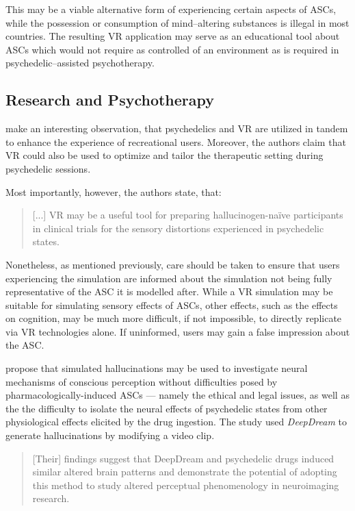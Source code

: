 This may be a viable alternative form of experiencing certain aspects of \acp{ASC}, while the possession or consumption of mind--altering substances is illegal in most countries. The resulting \ac{VR} application may serve as an educational tool about \acp{ASC} which would not require as controlled of an environment as is required in psychedelic--assisted psychotherapy.

\subsection{Research and Psychotherapy}
\textcite{aday2020psychedelics} make an interesting observation, that psychedelics and VR are utilized in tandem to enhance the experience of recreational users. Moreover, the authors claim that VR could also be used to optimize and tailor the therapeutic setting during psychedelic sessions.

Most importantly, however, the authors state, that:

\begin{quote}
    [...] VR may be a useful tool for preparing hallucinogen-naïve participants in clinical trials for the sensory distortions experienced in psychedelic states.
\end{quote}

Nonetheless, as mentioned previously, care should be taken to ensure that users experiencing the simulation are informed about the simulation not being fully representative of the \ac{ASC} it is modelled after. While a \ac{VR} simulation may be suitable for simulating sensory effects of \acp{ASC}, other effects, such as the effects on cognition, may be much more difficult, if not impossible, to directly replicate via \ac{VR} technologies alone. If uninformed, users may gain a false impression about the \ac{ASC}.

\textcite{greco2021increased} propose that simulated hallucinations may be used to investigate neural mechanisms of conscious perception without difficulties posed by pharmacologically-induced \acp{ASC} --- namely the ethical and legal issues, as well as the the difficulty to isolate the neural effects of psychedelic states from other physiological effects elicited by the drug ingestion. The study used \textit{DeepDream} \autocite{mordvintsev2015inceptionism} to generate hallucinations by modifying a video clip.

\begin{quote}
    [Their] findings suggest that DeepDream and psychedelic drugs induced similar altered brain patterns and demonstrate the potential of adopting this method to study altered perceptual phenomenology in neuroimaging research.
\end{quote}

